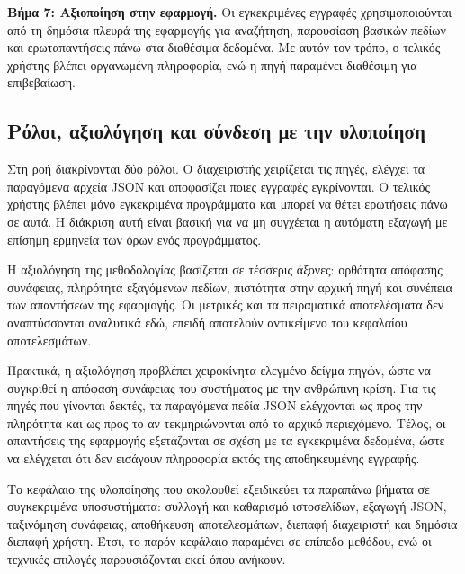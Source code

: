\textbf{Βήμα 7: Αξιοποίηση στην εφαρμογή.}
Οι εγκεκριμένες εγγραφές χρησιμοποιούνται από τη δημόσια πλευρά της εφαρμογής
για αναζήτηση, παρουσίαση βασικών πεδίων και ερωταπαντήσεις πάνω στα διαθέσιμα
δεδομένα. Με αυτόν τον τρόπο, ο τελικός χρήστης βλέπει οργανωμένη πληροφορία,
ενώ η πηγή παραμένει διαθέσιμη για επιβεβαίωση.

\subsection{Ρόλοι, αξιολόγηση και σύνδεση με την υλοποίηση}

Στη ροή διακρίνονται δύο ρόλοι. Ο διαχειριστής χειρίζεται τις πηγές, ελέγχει
τα παραγόμενα αρχεία JSON και αποφασίζει ποιες εγγραφές εγκρίνονται. Ο τελικός
χρήστης βλέπει μόνο εγκεκριμένα προγράμματα και μπορεί να θέτει ερωτήσεις πάνω
σε αυτά.
Η διάκριση αυτή είναι βασική για να μη συγχέεται η αυτόματη εξαγωγή με επίσημη
ερμηνεία των όρων ενός προγράμματος.

Η αξιολόγηση της μεθοδολογίας βασίζεται σε τέσσερις άξονες: ορθότητα απόφασης
συνάφειας, πληρότητα εξαγόμενων πεδίων, πιστότητα στην αρχική πηγή και συνέπεια
των απαντήσεων της εφαρμογής. Οι μετρικές και τα πειραματικά αποτελέσματα δεν
αναπτύσσονται αναλυτικά εδώ, επειδή αποτελούν αντικείμενο του κεφαλαίου
αποτελεσμάτων.

Πρακτικά, η αξιολόγηση προβλέπει χειροκίνητα ελεγμένο δείγμα πηγών, ώστε να
συγκριθεί η απόφαση συνάφειας του συστήματος με την ανθρώπινη κρίση. Για τις
πηγές που γίνονται δεκτές, τα παραγόμενα πεδία JSON ελέγχονται ως προς την
πληρότητα και ως προς το αν τεκμηριώνονται από το αρχικό περιεχόμενο. Τέλος, οι
απαντήσεις της εφαρμογής εξετάζονται σε σχέση με τα εγκεκριμένα δεδομένα, ώστε
να ελέγχεται ότι δεν εισάγουν πληροφορία εκτός της αποθηκευμένης εγγραφής.

Το κεφάλαιο της υλοποίησης που ακολουθεί εξειδικεύει τα παραπάνω βήματα σε
συγκεκριμένα υποσυστήματα: συλλογή και καθαρισμό ιστοσελίδων, εξαγωγή JSON,
ταξινόμηση συνάφειας, αποθήκευση αποτελεσμάτων, διεπαφή διαχειριστή και
δημόσια διεπαφή χρήστη. Έτσι, το παρόν κεφάλαιο παραμένει σε επίπεδο μεθόδου,
ενώ οι τεχνικές επιλογές παρουσιάζονται εκεί όπου ανήκουν.
